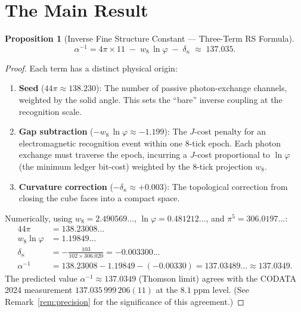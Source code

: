 \documentclass[12pt,a4paper]{article}
\newtheorem{proposition}[theorem]{Proposition}
\theoremstyle{definition}
\theoremstyle{remark}
\begin{document}
\section{The Main Result}
\label{sec:derivation}

\begin{proposition}[Inverse Fine Structure Constant --- Three-Term RS Formula]
\label{thm:alpha}
\begin{equation}
  \boxed{\alpha^{-1} = 4\pi \times 11 \;-\;
  w_8\,\ln\varphi \;-\; \delta_\kappa
  \;\approx\; 137.035.}
\end{equation}
\end{proposition}

\begin{proof}
Each term has a distinct physical origin:
\begin{enumerate}[label=(\roman*),nosep]
  \item \textbf{Seed} ($44\pi \approx 138.230$): The number of
  passive photon-exchange channels, weighted by the solid angle.
  This sets the ``bare'' inverse coupling at the recognition scale.

  \item \textbf{Gap subtraction} ($-w_8\,\ln\varphi \approx
  -1.199$): The $J$-cost penalty for an electromagnetic
  recognition event within one 8-tick epoch.  Each photon exchange
  must traverse the epoch, incurring a $J$-cost proportional to
  $\ln\varphi$ (the minimum ledger bit-cost) weighted by the
  8-tick projection $w_8$.

  \item \textbf{Curvature correction}
  ($-\delta_\kappa \approx +0.003$): The topological correction
  from closing the cube faces into a compact space.
\end{enumerate}

Numerically, using $w_8 = 2.490569\ldots$, $\ln\varphi = 0.481212\ldots$,
and $\pi^5 = 306.0197\ldots$:
\begin{align}
  44\pi &= 138.23008\ldots \\
  w_8\ln\varphi &= 1.19849\ldots \\
  \delta_\kappa &= -\frac{103}{102 \times 306.020} = -0.003300\ldots \\[4pt]
  \alpha^{-1} &= 138.23008 - 1.19849 - (-0.00330)
  = 137.03489\ldots \approx 137.0349.
\end{align}
The predicted value $\alpha^{-1} \approx 137.0349$ (Thomson limit) agrees
with the CODATA 2024 measurement $137.035\,999\,206(11)$ at the
$8.1\;\mathrm{ppm}$ level.  (See Remark~\ref{rem:precision} for the
significance of this agreement.)
\end{proof}
\end{document}
